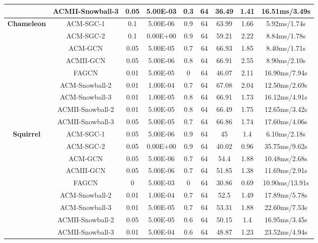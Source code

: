 \documentclass{article}
\newcommand{\0}{{\boldsymbol{0}}}
\newcommand{\6}{{\partial}}
\newcommand{\8}{{\infty}}
\newcommand{\4}{{\nabla}}
\begin{document}
\begin{table}[htbp]
{\begin{tabular}{c|c|ccccccc}
          & ACMII-Snowball-3 & 0.05  & 5.00E-03 & 0.3   & 64    & 36.49 & 1.41  & 16.51ms/3.49s \\
           \midrule
    \multirow{9}[0]{*}{\textbf{Chameleon}} & ACM-SGC-1 & 0.1   & 5.00E-06 & 0.9   & 64    & 63.99 & 1.66  & 5.92ms/1.74s \\
          & ACM-SGC-2 & 0.1   & 0.00E+00 & 0.9   & 64    & 59.21 & 2.22  & 8.84ms/1.78s \\
          & ACM-GCN & 0.05  & 5.00E-05 & 0.7   & 64    & 66.93 & 1.85  & 8.40ms/1.71s \\
          & ACMII-GCN & 0.05  & 5.00E-06 & 0.8   & 64    & 66.91 & 2.55  & 8.90ms/2.10s \\
          & FAGCN & 0.01  & 5.00E-05 & 0     & 64    & 46.07 & 2.11  & 16.90ms/7.94s \\
          & ACM-Snowball-2 & 0.01  & 1.00E-04 & 0.7   & 64    & 67.08 & 2.04  & 12.50ms/2.69s \\
          & ACM-Snowball-3 & 0.01  & 1.00E-05 & 0.8   & 64    & 66.91 & 1.73  & 16.12ms/4.91s \\
          & ACMII-Snowball-2 & 0.01  & 5.00E-05 & 0.8   & 64    & 66.49 & 1.75  & 12.65ms/3.42s \\
          & ACMII-Snowball-3 & 0.05  & 5.00E-05 & 0.7   & 64    & 66.86 & 1.74  & 17.60ms/4.06s \\
           \midrule
    \multirow{9}[0]{*}{\textbf{Squirrel}} & ACM-SGC-1 & 0.05  & 5.00E-06 & 0.9   & 64    & 45    & 1.4   & 6.10ms/2.18s \\
          & ACM-SGC-2 & 0.05  & 0.00E+00 & 0.9   & 64    & 40.02 & 0.96  & 35.75ms/9.62s \\
          & ACM-GCN & 0.05  & 5.00E-06 & 0.7   & 64    & 54.4  & 1.88  & 10.48ms/2.68s \\
          & ACMII-GCN & 0.05  & 5.00E-06 & 0.7   & 64    & 51.85 & 1.38  & 11.69ms/2.91s \\
          & FAGCN & 0     & 5.00E-03 & 0     & 64    & 30.86 & 0.69  & 10.90ms/13.91s \\
          & ACM-Snowball-2 & 0.01  & 1.00E-04 & 0.7   & 64    & 52.5  & 1.49  & 17.89ms/5.78s \\
          & ACM-Snowball-3 & 0.01  & 5.00E-05 & 0.7   & 64    & 53.31 & 1.88  & 22.60ms/7.53s \\
          & ACMII-Snowball-2 & 0.05  & 5.00E-05 & 0.6   & 64    & 50.15 & 1.4   & 16.95ms/3.45s \\
          & ACMII-Snowball-3 & 0.01  & 5.00E-04 & 0.6   & 64    & 48.87 & 1.23  & 23.52ms/4.94s \\

\end{tabular}}
\end{table}
\end{document}
